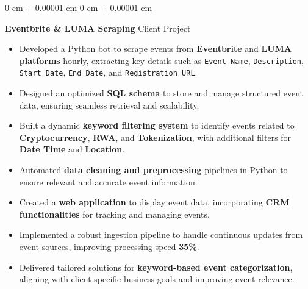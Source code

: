 \documentclass[10pt, letterpaper]{article}
\newenvironment{highlights}{
    \begin{itemize}[
        topsep=0.10 cm,
        parsep=0.10 cm,
        partopsep=0pt,
        itemsep=0pt,
        leftmargin=0 cm + 10pt
    ]
}{
    \end{itemize}
} %
\newenvironment{onecolentry}{
    \begin{adjustwidth}{
        0 cm + 0.00001 cm
    }{
        0 cm + 0.00001 cm
    }
}{
    \end{adjustwidth}
} %
\begin{document}
\vspace{0.15 cm}

\begin{onecolentry}
	\textbf{Eventbrite \& LUMA Scraping} \hfill Client Project
	\begin{highlights}
		\item Developed a Python bot to scrape events from \textbf{Eventbrite} and \textbf{LUMA platforms} hourly, extracting key details such as \texttt{Event Name}, \texttt{Description}, \texttt{Start Date}, \texttt{End Date}, and \texttt{Registration URL}.
		\item Designed an optimized \textbf{SQL schema} to store and manage structured event data, ensuring seamless retrieval and scalability.
		\item Built a dynamic \textbf{keyword filtering system} to identify events related to \textbf{Cryptocurrency}, \textbf{RWA}, and \textbf{Tokenization}, with additional filters for \textbf{Date Time} and \textbf{Location}.
		\item Automated \textbf{data cleaning and preprocessing} pipelines in Python to ensure relevant and accurate event information.
		\item Created a \textbf{web application} to display event data, incorporating \textbf{CRM functionalities} for tracking and managing events.
		\item Implemented a robust ingestion pipeline to handle continuous updates from event sources, improving processing speed \textbf{35\%}.
		\item Delivered tailored solutions for \textbf{keyword-based event categorization}, aligning with client-specific business goals and improving event relevance.
	\end{highlights}
\end{onecolentry}

\vspace{0.15 cm}
\end{document}
